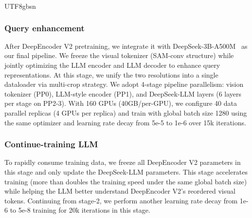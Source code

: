 \documentclass[11pt, a4paper, logo, copyright, nonumbering]{deepseek}
\begin{document}
\begin{CJK*}{UTF8}{gbsn}
\subsubsection{Query enhancement}
After DeepEncoder V2 pretraining, we integrate it with DeepSeek-3B-A500M~\cite{deepseekv2,deepseekv3} as our final pipeline. We freeze the visual tokenizer (SAM-conv structure) while jointly optimizing the LLM encoder and LLM decoder to enhance query representations. At this stage, we unify the two resolutions into a single dataloader via multi-crop strategy. We adopt 4-stage pipeline parallelism: vision tokenizer (PP0), LLM-style encoder (PP1), and DeepSeek-LLM layers (6 layers per stage on PP2-3). With 160 GPUs (40GB/per-GPU), we configure 40 data parallel replicas (4 GPUs per replica) and train with global batch size 1280 using the same optimizer and learning rate decay from 5e-5 to 1e-6 over 15k iterations.

\subsubsection{Continue-training LLM}
To rapidly consume training data, we freeze all DeepEncoder V2 parameters in this stage and only update the DeepSeek-LLM parameters. This stage accelerates training (more than doubles the training speed under the same global batch size) while helping the LLM better understand DeepEncoder V2's reordered visual tokens. Continuing from stage-2, we perform another learning rate decay from 1e-6 to 5e-8 training for 20k iterations in this stage.



\end{CJK*}
\end{document}
